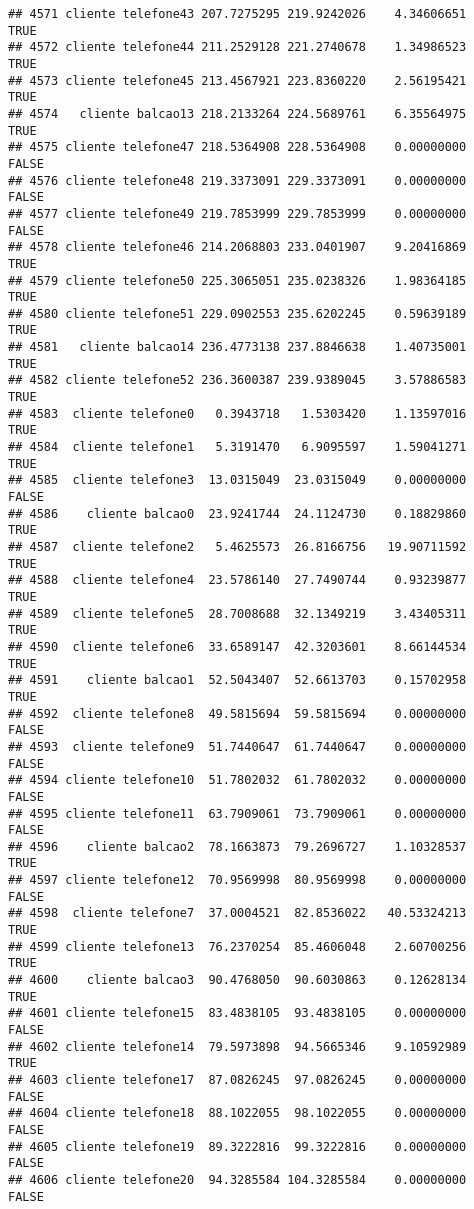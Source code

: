 \documentclass[
]{article}
\begin{document}
\begin{verbatim}
## 4571 cliente telefone43 207.7275295 219.9242026    4.34606651     TRUE
## 4572 cliente telefone44 211.2529128 221.2740678    1.34986523     TRUE
## 4573 cliente telefone45 213.4567921 223.8360220    2.56195421     TRUE
## 4574   cliente balcao13 218.2133264 224.5689761    6.35564975     TRUE
## 4575 cliente telefone47 218.5364908 228.5364908    0.00000000    FALSE
## 4576 cliente telefone48 219.3373091 229.3373091    0.00000000    FALSE
## 4577 cliente telefone49 219.7853999 229.7853999    0.00000000    FALSE
## 4578 cliente telefone46 214.2068803 233.0401907    9.20416869     TRUE
## 4579 cliente telefone50 225.3065051 235.0238326    1.98364185     TRUE
## 4580 cliente telefone51 229.0902553 235.6202245    0.59639189     TRUE
## 4581   cliente balcao14 236.4773138 237.8846638    1.40735001     TRUE
## 4582 cliente telefone52 236.3600387 239.9389045    3.57886583     TRUE
## 4583  cliente telefone0   0.3943718   1.5303420    1.13597016     TRUE
## 4584  cliente telefone1   5.3191470   6.9095597    1.59041271     TRUE
## 4585  cliente telefone3  13.0315049  23.0315049    0.00000000    FALSE
## 4586    cliente balcao0  23.9241744  24.1124730    0.18829860     TRUE
## 4587  cliente telefone2   5.4625573  26.8166756   19.90711592     TRUE
## 4588  cliente telefone4  23.5786140  27.7490744    0.93239877     TRUE
## 4589  cliente telefone5  28.7008688  32.1349219    3.43405311     TRUE
## 4590  cliente telefone6  33.6589147  42.3203601    8.66144534     TRUE
## 4591    cliente balcao1  52.5043407  52.6613703    0.15702958     TRUE
## 4592  cliente telefone8  49.5815694  59.5815694    0.00000000    FALSE
## 4593  cliente telefone9  51.7440647  61.7440647    0.00000000    FALSE
## 4594 cliente telefone10  51.7802032  61.7802032    0.00000000    FALSE
## 4595 cliente telefone11  63.7909061  73.7909061    0.00000000    FALSE
## 4596    cliente balcao2  78.1663873  79.2696727    1.10328537     TRUE
## 4597 cliente telefone12  70.9569998  80.9569998    0.00000000    FALSE
## 4598  cliente telefone7  37.0004521  82.8536022   40.53324213     TRUE
## 4599 cliente telefone13  76.2370254  85.4606048    2.60700256     TRUE
## 4600    cliente balcao3  90.4768050  90.6030863    0.12628134     TRUE
## 4601 cliente telefone15  83.4838105  93.4838105    0.00000000    FALSE
## 4602 cliente telefone14  79.5973898  94.5665346    9.10592989     TRUE
## 4603 cliente telefone17  87.0826245  97.0826245    0.00000000    FALSE
## 4604 cliente telefone18  88.1022055  98.1022055    0.00000000    FALSE
## 4605 cliente telefone19  89.3222816  99.3222816    0.00000000    FALSE
## 4606 cliente telefone20  94.3285584 104.3285584    0.00000000    FALSE

\end{verbatim}
\end{document}

